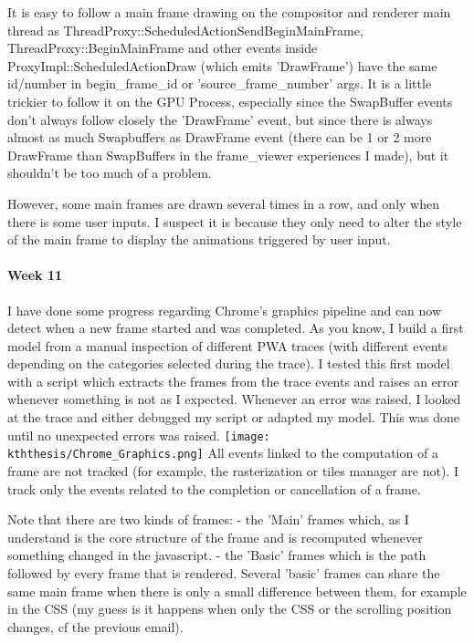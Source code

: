 \documentclass{kththesis}
\begin{document}
It is easy to follow a main frame drawing on the compositor and renderer main thread as ThreadProxy::ScheduledActionSendBeginMainFrame, ThreadProxy::BeginMainFrame and other events inside ProxyImpl::ScheduledActionDraw (which emits 'DrawFrame') have the same id/number in begin{\_}frame{\_}id or 'source{\_}frame{\_}number' args. It is a little trickier to follow it on the GPU Process, especially since the SwapBuffer events don't always follow closely the 'DrawFrame' event, but since there is always almost as much Swapbuffers as DrawFrame event (there can be 1 or 2 more DrawFrame than SwapBuffers in the frame{\_}viewer experiences I made), but it shouldn't be too much of a problem.

However, some main frames are drawn several times in a row, and only when there is some user inputs. I suspect it is because they only need to alter the style of the main frame to display the animations triggered by user input.

\paragraph{Week 11}
I have done some progress regarding Chrome's graphics pipeline and can now detect when a new frame started and was completed.
As you know, I build a first model from a manual inspection of different PWA traces (with different events depending on the categories selected during the trace). I tested this first model with a script which extracts the frames from the trace events and raises an error whenever something is not as I expected. Whenever an error was raised, I looked at the trace and either debugged my script or adapted my model. This was done until no unexpected errors was raised.
\newline
\texttt{[image: kththesis/Chrome\_Graphics.png]}
\newline
All events linked to the computation of a frame are not tracked (for example, the rasterization or tiles manager are not). I track only the events related to the completion or cancellation of a frame.

Note that there are two kinds of frames:
    - the 'Main' frames which, as I understand is the core structure of the frame and is recomputed whenever something changed in the javascript.
    - the 'Basic' frames which is the path followed by every frame that is rendered. Several 'basic' frames can share the same main frame when there is only a small difference between them, for example in the CSS (my guess is it happens when only the CSS or the scrolling position changes, cf the previous email).
\end{document}
